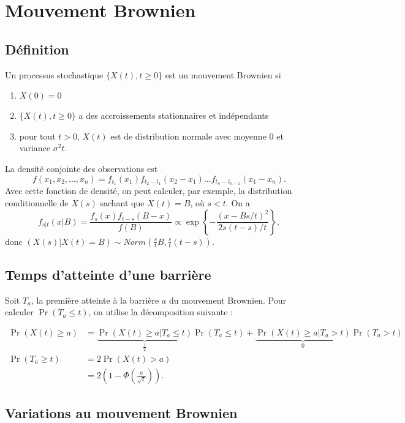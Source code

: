 \chapter{Mouvement Brownien}

\section{Définition}

\begin{definition}{}{}
	Un processus stochastique $\{X(t), t\geq 0\}$ est un mouvement Brownien si 
	\begin{enumerate}
		\item $X(0) = 0$
		\item $\{X(t), t\geq 0\}$ a des accroissements stationnaires et indépendants
		\item pour tout $t>0$, $X(t)$ est de distribution normale avec moyenne 0 et variance $\sigma^2 t$.
	\end{enumerate}
\end{definition}

La densité conjointe des observations est 
$$f(x_1, x_2, \dots, x_n) = f_{t_1}(x_1)f_{t_2 - t_1}(x_2 - x_1) \dots f_{t_n - t_{n-1}}(x_1 - x_n).$$
Avec cette fonction de densité, on peut calculer, par exemple, la distribution conditionnelle de $X(s)$ sachant que $X(t) = B$, où $s<t$. On a 
$$f_{s\vert t}(x \vert B) = \frac{f_{s}(x) f_{t-s}(B - x)}{f(B)} \propto \exp\left\{-\frac{(x - Bs/t)^2}{2s(t-s)/t}\right\},$$
donc $(X(s) \vert X(t) = B) \sim Norm\left(\frac{s}{t}B, \frac{s}{t}(t-s)\right)$. 

\section{Temps d'atteinte d'une barrière}

Soit $T_a$, la première atteinte à la barrière $a$ du mouvement Brownien. Pour calculer $\Pr(T_a \leq t)$, on utilise la décomposition suivante : 

\begin{align*}
\Pr(X(t) \geq a) &= \underbrace{\Pr(X(t) \geq a \vert T_a \leq t)}_{\frac{1}{2}} \Pr(T_a \leq t) + \underbrace{\Pr(X(t) \geq a \vert T_a > t)}_{0} \Pr(T_a > t)\\
\Pr(T_a \geq t) &= 2\Pr(X(t) > a)\\
&= 2\left(1 - \Phi \left(\frac{a}{\sqrt{t}}\right)\right).
\end{align*}

\section{Variations au mouvement Brownien}

